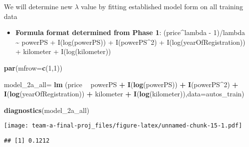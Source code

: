\documentclass[]{article}
\newenvironment{Shaded}{\begin{snugshade}}{\end{snugshade}}
\newcommand{\DataTypeTok}[1]{\textcolor[rgb]{0.13,0.29,0.53}{#1}}
\newcommand{\DecValTok}[1]{\textcolor[rgb]{0.00,0.00,0.81}{#1}}
\newcommand{\FloatTok}[1]{\textcolor[rgb]{0.00,0.00,0.81}{#1}}
\newcommand{\KeywordTok}[1]{\textcolor[rgb]{0.13,0.29,0.53}{\textbf{#1}}}
\newcommand{\NormalTok}[1]{#1}
\newcommand{\OperatorTok}[1]{\textcolor[rgb]{0.81,0.36,0.00}{\textbf{#1}}}
\newcommand{\OtherTok}[1]{\textcolor[rgb]{0.56,0.35,0.01}{#1}}
\newcommand{\StringTok}[1]{\textcolor[rgb]{0.31,0.60,0.02}{#1}}
\providecommand{\tightlist}{%
  \setlength{\itemsep}{0pt}\setlength{\parskip}{0pt}}
\begin{document}
We will determine new \(\lambda\) value by fitting established model
form on all training data

\begin{itemize}
\tightlist
\item
  \textbf{Formula format determined from Phase 1}: (price\^{}lambda -
  1)/lambda \textasciitilde{} powerPS + I(log(powerPS)) +
  I(powerPS\^{}2) + I(log(yearOfRegistration)) + kilometer +
  I(log(kilometer))
\end{itemize}

\begin{Shaded}
\begin{Highlighting}[]
\KeywordTok{par}\NormalTok{(}\DataTypeTok{mfrow=}\KeywordTok{c}\NormalTok{(}\DecValTok{1}\NormalTok{,}\DecValTok{1}\NormalTok{))}

\NormalTok{model_2a_all=}\StringTok{ }\KeywordTok{lm}\NormalTok{ (price }\OperatorTok{~}\StringTok{ }\NormalTok{powerPS }\OperatorTok{+}\StringTok{ }\KeywordTok{I}\NormalTok{(}\KeywordTok{log}\NormalTok{(powerPS)) }\OperatorTok{+}\StringTok{ }\KeywordTok{I}\NormalTok{(powerPS}\OperatorTok{^}\DecValTok{2}\NormalTok{) }\OperatorTok{+}\StringTok{ }\KeywordTok{I}\NormalTok{(}\KeywordTok{log}\NormalTok{(yearOfRegistration)) }\OperatorTok{+}\StringTok{ }\NormalTok{kilometer }\OperatorTok{+}\StringTok{ }\KeywordTok{I}\NormalTok{(}\KeywordTok{log}\NormalTok{(kilometer)),}\DataTypeTok{data=}\NormalTok{autos_train)}

\KeywordTok{diagnostics}\NormalTok{(model_2a_all)}
\end{Highlighting}
\end{Shaded}

\texttt{[image: team-a-final-proj\_files/figure-latex/unnamed-chunk-15-1.pdf]}

\begin{Shaded}
\end{Shaded}

\begin{verbatim}
## [1] 0.1212
\end{verbatim}
\end{document}
